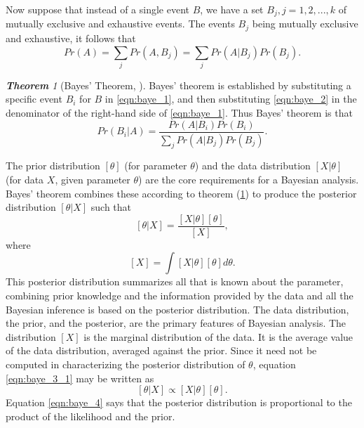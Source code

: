 \documentclass[12pt,oneside,a4paper]{book}
\theoremstyle{definition}
\theoremstyle{remark}
\newtheorem{thm}{\bf Theorem}[subsection]
\begin{document}
				Now suppose that instead of a single event $B$, we have a set $B_j,j = 1,2,. . . ,k$ of mutually exclusive and exhaustive events. The events $B_j$ being mutually exclusive and exhaustive, it follows that
				\begin{equation}\label{eqn:baye_2}
					Pr(A) = \sum_j Pr(A,B_j) = \sum_j Pr(A|B_j) Pr(B_j).
				\end{equation}

				\begin{thm}[Bayes' Theorem, \cite{link2009bayesian}]\label{thm:bayestheorem}
					Bayes’ theorem is established by substituting a specific event $B_i$ for $B$ in \eqref{eqn:baye_1}, and then substituting \eqref{eqn:baye_2} in the denominator of the right-hand side of \eqref{eqn:baye_1}. Thus Bayes’ theorem is that
					\begin{equation}
						Pr(B_i|A) = \frac{Pr(A|B_i)Pr(B_i)}{\sum_j Pr(A|B_j) Pr(B_j)}.
					\end{equation}
				\end{thm}

				The prior distribution $[\theta]$ (for parameter $\theta$) and the data distribution $[X|\theta]$ (for data $X$, given parameter $\theta$) are the core requirements for a Bayesian analysis. Bayes' theorem combines these according to theorem (\ref{thm:bayestheorem}) to produce the posterior distribution $[\theta|X]$ such that
				\begin{equation}\label{eqn:baye_3_1}
					[\theta|X] = \frac{[X|\theta][\theta]}{[X]},
				\end{equation}
				where
				\begin{equation}\label{eqn:baye_3_2}
					[X]=\int [X|\theta][\theta]d\theta.
				\end{equation}
				This posterior distribution summarizes all that is known about the parameter, combining prior knowledge and the information provided by the data and all the Bayesian inference is based on the posterior distribution. The data distribution, the prior, and the posterior, are the primary	features of Bayesian analysis. The distribution $[X]$ is the marginal distribution of the data. It is the average value of the data distribution, averaged against the prior. Since it need not be computed in characterizing the posterior distribution of $\theta$, equation \eqref{eqn:baye_3_1} may be written as
				\begin{equation}\label{eqn:baye_4}
					[\theta|X] \propto [X|\theta][\theta].
				\end{equation}
				Equation \eqref{eqn:baye_4} says that the posterior distribution is proportional to the product of the likelihood and the prior.
\end{document}
